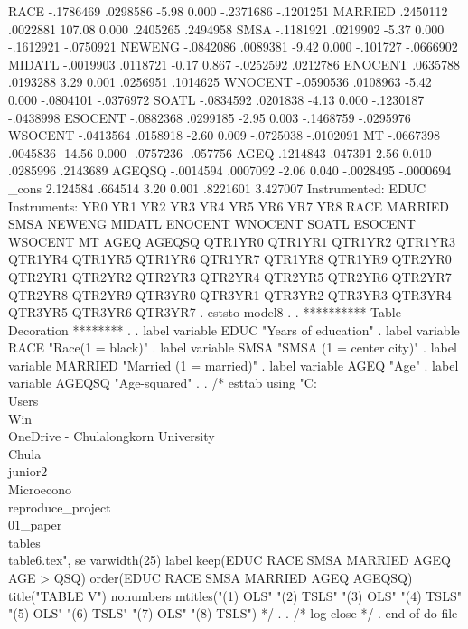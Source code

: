         RACE {\VBAR}  -.1786469   .0298586    -5.98   0.000    -.2371686   -.1201251
     MARRIED {\VBAR}   .2450112   .0022881   107.08   0.000     .2405265    .2494958
        SMSA {\VBAR}  -.1181921   .0219902    -5.37   0.000    -.1612921   -.0750921
      NEWENG {\VBAR}  -.0842086   .0089381    -9.42   0.000     -.101727   -.0666902
      MIDATL {\VBAR}  -.0019903   .0118721    -0.17   0.867    -.0252592    .0212786
     ENOCENT {\VBAR}   .0635788   .0193288     3.29   0.001     .0256951    .1014625
     WNOCENT {\VBAR}  -.0590536   .0108963    -5.42   0.000    -.0804101   -.0376972
       SOATL {\VBAR}  -.0834592   .0201838    -4.13   0.000    -.1230187   -.0438998
     ESOCENT {\VBAR}  -.0882368   .0299185    -2.95   0.003    -.1468759   -.0295976
     WSOCENT {\VBAR}  -.0413564   .0158918    -2.60   0.009    -.0725038   -.0102091
          MT {\VBAR}  -.0667398   .0045836   -14.56   0.000    -.0757236    -.057756
        AGEQ {\VBAR}   .1214843    .047391     2.56   0.010     .0285996    .2143689
      AGEQSQ {\VBAR}  -.0014594   .0007092    -2.06   0.040    -.0028495   -.0000694
       _cons {\VBAR}   2.124584    .664514     3.20   0.001     .8221601    3.427007
Instrumented:  EDUC
Instruments:   YR0 YR1 YR2 YR3 YR4 YR5 YR6 YR7 YR8 RACE MARRIED SMSA NEWENG
               MIDATL ENOCENT WNOCENT SOATL ESOCENT WSOCENT MT AGEQ AGEQSQ
               QTR1YR0 QTR1YR1 QTR1YR2 QTR1YR3 QTR1YR4 QTR1YR5 QTR1YR6
               QTR1YR7 QTR1YR8 QTR1YR9 QTR2YR0 QTR2YR1 QTR2YR2 QTR2YR3
               QTR2YR4 QTR2YR5 QTR2YR6 QTR2YR7 QTR2YR8 QTR2YR9 QTR3YR0
               QTR3YR1 QTR3YR2 QTR3YR3 QTR3YR4 QTR3YR5 QTR3YR6 QTR3YR7
{\smallskip}
. eststo model8
{\smallskip}
. 
. **********  Table Decoration ********
. 
. label variable EDUC   "Years of education"
{\smallskip}
. label variable RACE   "Race(1 = black)"
{\smallskip}
. label variable SMSA   "SMSA (1 = center city)"
{\smallskip}
. label variable MARRIED   "Married (1 = married)"
{\smallskip}
. label variable AGEQ   "Age"
{\smallskip}
. label variable AGEQSQ   "Age-squared"
{\smallskip}
. 
. /* esttab using "C:\\Users\\Win\\OneDrive - Chulalongkorn University\\Chula\\junior2\\Microecono\\reproduce_project\\01_paper\\tables\\table6.tex", se varwidth(25) label keep(EDUC RACE SMSA MARRIED AGEQ AGE
> QSQ)  order(EDUC RACE SMSA MARRIED AGEQ AGEQSQ) title("TABLE V") nonumbers mtitles("(1) OLS" "(2) TSLS" "(3) OLS" "(4) TSLS" "(5) OLS" "(6) TSLS" "(7) OLS" "(8) TSLS") */
. 
. /* log close */
. 
end of do-file
{\smallskip}
